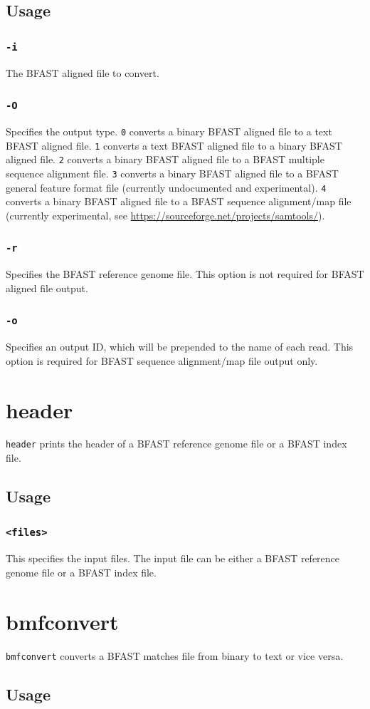 \documentclass[a4paper,12pt]{book}
\newcommand{\TT}[1]{{\tt #1}} %
\newcommand{\BRGF}{BFAST reference genome file} %
\newcommand{\BIF}{BFAST index file} %
\newcommand{\BMF}{BFAST matches file} %
\newcommand{\BAF}{BFAST aligned file} %
\newcommand{\BMAF}{BFAST multiple sequence alignment file} %
\newcommand{\BGFFF}{BFAST general feature format file} %
\newcommand{\BSAMF}{BFAST sequence alignment/map file} %
\begin{document}
\subsection{Usage}
\subsubsection{\TT{-i}}
The \BAF{} to convert.
\subsubsection{\TT{-O}}
Specifies the output type.
\TT{0} converts a binary \BAF{} to a text \BAF{}.
\TT{1} converts a text \BAF{} to a binary \BAF{}.
\TT{2} converts a binary \BAF{} to a \BMAF{}.
\TT{3} converts a binary \BAF{} to a \BGFFF{} (currently undocumented and experimental).
\TT{4} converts a binary \BAF{} to a \BSAMF{} (currently experimental, see \url{https://sourceforge.net/projects/samtools/}).
\subsubsection{\TT{-r}}
Specifies the \BRGF{}.
This option is not required for \BAF{} output.
\subsubsection{\TT{-o}}
Specifies an output ID, which will be prepended to the name of each read.
This option is required for \BSAMF{} output only.

\section{header}
\label{sec:header}
\TT{header} prints the header of a \BRGF{} or a \BIF{}.
\subsection{Usage}
\subsubsection{\TT{<files>}}
This specifies the input files. 
The input file can be either a \BRGF{} or a \BIF{}.

\section{bmfconvert}
\label{sec:bmfconvert}
\TT{bmfconvert} converts a \BMF{} from binary to text or vice versa.
\subsection{Usage}
\end{document}

